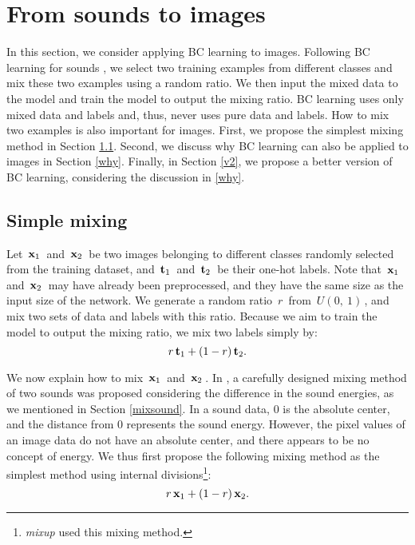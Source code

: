 \documentclass[10pt,twocolumn,letterpaper]{article}
\begin{document}
\section{From sounds to images}\label{3}
In this section, we consider applying BC learning to images. Following BC learning for sounds \cite{tokozume2018learning}, we select two training examples from different classes and mix these two examples using a random ratio. We then input the mixed data to the model and train the model to output the mixing ratio. BC learning uses only mixed data and labels and, thus, never uses pure data and labels. How to mix two examples is also important for images. First, we propose the simplest mixing method in Section \ref{v1}. Second, we discuss why BC learning can also be applied to images in Section \ref{why}. Finally, in Section \ref{v2}, we propose a better version of BC learning, considering the discussion in \ref{why}.

\subsection{Simple mixing}\label{v1}
Let $\, {\bf x}_1\, $ and $\, {\bf x}_2 \,$ be two images belonging to different classes randomly selected from the training dataset, and $\, {\bf t}_1\, $ and $\, {\bf t}_2 \,$ be their one-hot labels. Note that $\, {\bf x}_1\, $ and $\, {\bf x}_2 \,$ may have already been preprocessed, and they have the same size as the input size of the network. We generate a random ratio $\, r \,$ from $\, U(0,\ 1) \,$, and mix two sets of data and labels with this ratio. Because we aim to train the model to output the mixing ratio, we mix two labels simply by:
\begin{equation}
r \, {\bf t}_1 + (1-r) \, {\bf t}_2.
\end{equation}

We now explain how to mix $\, {\bf x}_1 \,$ and $\, {\bf x}_2 \,$. In \cite{tokozume2018learning}, a carefully designed mixing method of two sounds was proposed considering the difference in the sound energies, as we mentioned in Section \ref{mixsound}. In a sound data, $0$ is the absolute center, and the distance from $0$ represents the sound energy. However, the pixel values of an image data do not have an absolute center, and there appears to be no concept of energy. We thus first propose the following mixing method as the simplest method using internal divisions\footnote{{\it mixup} \cite{zhang2017mixup} used this mixing method.}:
\begin{equation}
 \label{eqn:v1}
  r \, {\bf x}_1 + (1-r) \, {\bf x}_2.
\end{equation}
\end{document}
